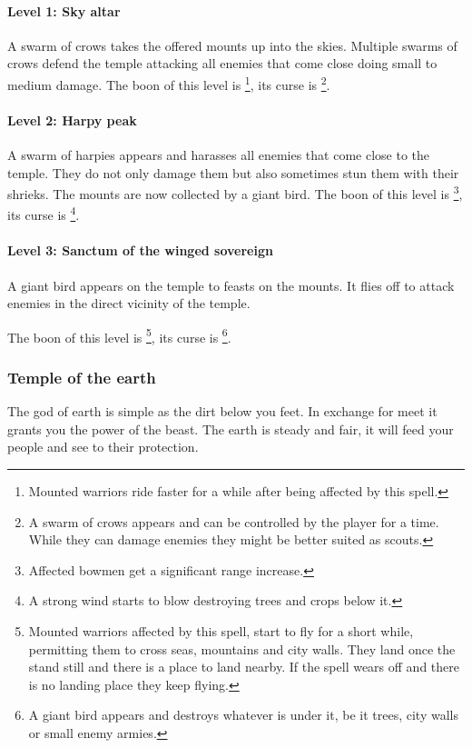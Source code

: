 \paragraph{Level 1: Sky altar}
A swarm of crows takes the offered mounts up into the skies. Multiple swarms of
crows defend the temple attacking all enemies that come close doing small to
medium damage. The boon of this level is \footnote{ Mounted warriors ride faster for a while after being affected
	by this spell. }, its curse is \footnote{ A swarm of
	crows appears and can be controlled by the player for a time. While they can
	damage enemies they might be better suited as scouts. }.

\paragraph{Level 2: Harpy peak}
A swarm of harpies appears and harasses all enemies that come close to the
temple. They do not only damage them but also sometimes stun them with their
shrieks. The mounts are now collected by a giant bird. The boon of this level
is \footnote{ Affected bowmen get a significant range
	increase. }, its curse is \footnote{ A strong wind
	starts to blow destroying trees and crops below it. }.

\paragraph{Level 3: Sanctum of the winged sovereign}
A giant bird appears on the temple to feasts on the mounts. It flies off to
attack enemies in the direct vicinity of the temple.

The boon of this level is \footnote{ Mounted warriors
	affected by this spell, start to fly for a short while, permitting them to
	cross seas, mountains and city walls. They land once the stand still and there
	is a place to land nearby. If the spell wears off and there is no landing place
	they keep flying. }, its curse is \footnote{ A giant
	bird appears and destroys whatever is under it, be it trees, city walls or
	small enemy armies. }.

\subsubsection{Temple of the earth}
The god of earth is simple as the dirt below you feet. In exchange for meet it
grants you the power of the beast. The earth is steady and fair, it will feed
your people and see to their protection.

